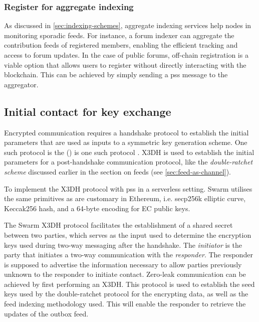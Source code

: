 \subsubsection{Register for aggregate indexing}

As discussed in \ref{sec:indexing-schemes}, aggregate indexing services help nodes in monitoring sporadic feeds. For instance, a forum indexer can aggregate the contribution feeds of registered members, enabling the efficient tracking and access to forum updates. In the case of public forums, off-chain registration is a viable option that allows users to register without directly interacting with the blockchain. This can be achieved by simply sending a pss message to the aggregator. 


\subsection{Initial contact for key exchange\statusgreen}\label{sec:pss-key-exchange}


Encrypted communication requires a handshake protocol to establish the initial parameters that are used as inputs to a symmetric key generation scheme. One such protocol is the  () is one such protocol \cite{marlinspike2016x3dh}.  X3DH is used to establish the initial parameters for a post-handshake communication protocol, like the \emph{double-ratchet scheme} discussed earlier in the section on feeds (see \ref{sec:feed-as-channel}). 

To implement the X3DH protocol with pss in a serverless setting. Swarm utilises the same primitives as are customary in Ethereum, i.e. secp256k elliptic curve, Keccak256 hash, and a 64-byte encoding for EC public keys. 

The Swarm X3DH protocol facilitates the establishment of a shared secret between two parties, which serves as the input used to determine the encryption keys used during two-way messaging after the handshake. The \emph{initiator} is the party that initiates a two-way communication with the \emph{responder}. The responder is supposed to advertise the information necessary to allow parties previously unknown to the responder to initiate contact. Zero-leak communication can be achieved by first performing an X3DH. This protocol is used to establish the seed keys used by the double-ratchet protocol for the encrypting data, as well as the feed indexing methodology used. This will enable the responder to retrieve the updates of the outbox feed.

